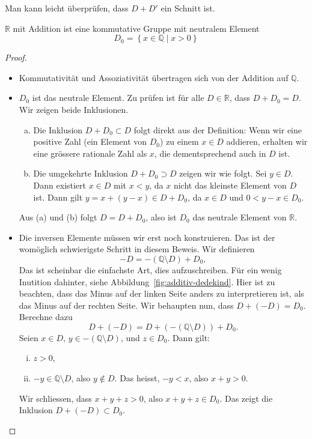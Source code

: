 \documentclass[../main.tex]{subfiles}
\begin{document}
Man kann leicht überprüfen, dass $D + D'$ ein Schnitt ist.

\begin{lemma}\label{lem:r-plus-gruppe}
  $\mathbb R$ mit Addition ist eine kommutative Gruppe mit neutralem Element
  \[D_{0} = \left\{x \in \mathbb Q \mid x > 0\right\}\]
\end{lemma}

\begin{proof}
  \leavevmode
  \begin{itemize}
    \item Kommutativität und Assoziativität übertragen sich von der Addition
      auf $\mathbb Q$.
    \item $D_{0}$ ist das neutrale Element. Zu prüfen ist
      für alle $D \in \mathbb R$, dass $D + D_{0} = D$. Wir
      zeigen beide Inklusionen.
      \begin{enumerate}[(a)]
        \item Die Inklusion $D + D_{0} \subset D$ folgt direkt aus
          der Definition: Wenn wir eine positive Zahl
          (ein Element von $D_{0}$) zu einem
          $x \in D$ addieren, erhalten wir eine grössere
          rationale Zahl als $x$, die dementsprechend auch in $D$ ist.
        \item Die umgekehrte Inklusion $D + D_{0} \supset D$ zeigen
          wir wie folgt. Sei $y \in D$. Dann existiert $x \in D$ mit
          $x < y$, da $x$ nicht das kleinste Element von $D$ ist.
          Dann gilt $y = x + (y - x) \in D + D_{0}$, da $x \in D$
          und $0 < y - x \in D_{0}$.
      \end{enumerate}
      Aus (a) und (b) folgt $D = D + D_{0}$, also ist $D_{0}$ das
      neutrale Element von $\mathbb R$.
    \item Die inversen Elemente müssen wir erst noch konstruieren.
      Das ist der womöglich schwierigste Schritt in diesem Beweis.
      Wir definieren
      \[-D = -(\mathbb Q \setminus D) + D_{0},\]
      Das ist scheinbar die einfachste Art, dies aufzuschreiben.
      Für ein wenig Inutition dahinter, siehe
      Abbildung~\ref{fig:additiv-dedekind}.
      Hier ist zu beachten, dass das Minus auf der linken Seite
      anders zu interpretieren ist, als das Minus auf der rechten
      Seite.
      Wir behaupten nun, dass $D + (-D) = D_{0}$. Berechne dazu
        \[D + (-D) = D  + (-(\mathbb Q \setminus D)) + D_{0}.\]
      Seien $x \in D$, $y \in -(\mathbb Q \setminus D)$, und $z \in D_{0}$.
      Dann gilt:
      \begin{enumerate}[(i)]
        \item $z > 0$,
        \item $-y \in \mathbb Q \setminus D$, also $y \notin D$.
          Das heisst, $-y < x$, also $x + y > 0$.
      \end{enumerate}
      Wir schliessen, dass $x + y + z > 0$, also $x + y + z \in D_{0}$.
      Das zeigt die Inklusion $D + (-D) \subset D_{0}$. 
      

\end{itemize}
\end{proof}
\end{document}
